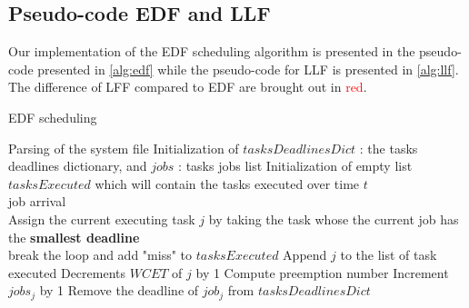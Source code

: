 \documentclass{article}
\begin{document}
\newpage
\subsection{Pseudo-code EDF and LLF}

Our implementation of the EDF scheduling algorithm is presented in the pseudo-code presented in \autoref{alg:edf} while the pseudo-code for LLF is presented in \autoref{alg:llf}. The difference of LFF compared to EDF are brought out in \textcolor{red}{red}. 

\vspace{5cm}
\begin{algorithm} 
  \caption{EDF scheduling} \label{alg:edf}
  \begin{algorithmic}[1]
  \State Parsing of the system file
  \State Initialization of $tasksDeadlinesDict$ : the tasks deadlines dictionary, and $jobs$ : tasks jobs list 
  \State Initialization of empty list $tasksExecuted$ which will contain the tasks executed over time $t$ \\
  \State job arrival 
  \EndIf 
  \EndFor
  \\
  \State Assign the current executing task $j$ by taking the task whose the current job 
  \State has the \textbf{smallest deadline} 
  \\
  \State break the loop and add "miss" to $tasksExecuted$
  \Else
  \State Append $j$ to the list of task executed 
  \State Decrements $WCET$ of $j$ by 1 
  \State Compute preemption number
  \State Increment $jobs_{j}$ by 1 
  \State Remove the deadline of $job_{j}$ from $tasksDeadlinesDict$ 
  \EndIf
  \EndIf
  \EndWhile
  \EndIf
  \EndProcedure
  \end{algorithmic}
\end{algorithm}
\end{document}
